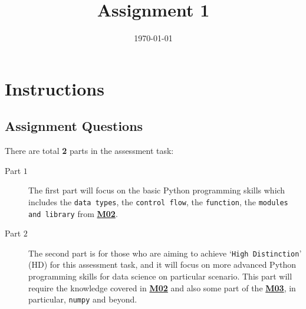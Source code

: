 \documentclass[a4paper]{article}
\date{\today}
\title{Assignment 1}
\begin{document}
    \header{}



    \begin{center}

      \end{center}

      \section*{Instructions}


      \subsection*{Assignment Questions}\label{sec:question}

      There are total \textbf{2} parts in the assessment task:
      \begin{description}
      \item[Part $1$]
      The first part will focus on the basic Python programming skills
      which includes the \texttt{data types}, the \texttt{control flow}, the \texttt{function},
      the \texttt{modules and library} from \href{https://github.com/tulip-lab/sit742/tree/develop/Jupyter/M02-Python}{\textbf{M02}}.

      \item[Part $2$]
      The second part is for those who are aiming to
      achieve `\texttt{High Distinction}' (HD) for this assessment task,
      and it will focus on more advanced Python programming skills for data science on particular scenario.
      This part will require the knowledge covered in \href{https://github.com/tulip-lab/sit742/tree/develop/Jupyter/M02-Python}{\textbf{M02}} and also some part of the \href{https://github.com/tulip-lab/sit742/blob/develop/Jupyter/M03-BigData/M03D-DataAcquisition-I.ipynb}{\textbf{M03}},
      in particular,
      \texttt{numpy} and beyond.
      \end{description}
\end{document}
